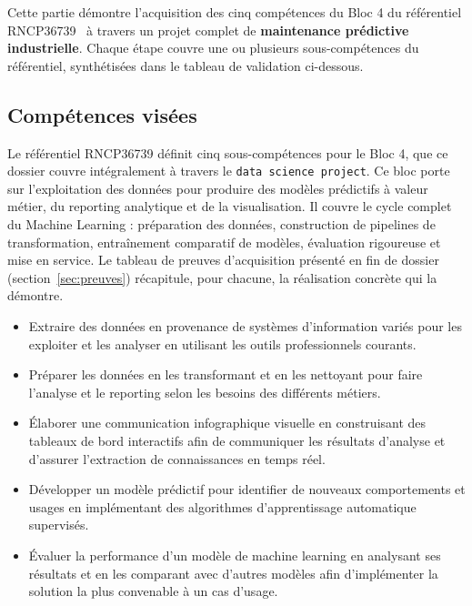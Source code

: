 \documentclass{article}
\begin{document}
Cette partie démontre l'acquisition des cinq compétences du Bloc 4 du référentiel
RNCP36739~\cite{rncp} à travers un projet complet de \textbf{maintenance prédictive
    industrielle}. Chaque étape couvre une ou plusieurs sous-compétences du référentiel,
synthétisées dans le tableau de validation ci-dessous.

\subsection{Compétences visées}

Le référentiel RNCP36739 définit cinq sous-compétences pour le Bloc 4, que ce
dossier couvre intégralement à travers le \texttt{data science project}.
Ce bloc porte sur l'exploitation des données pour produire des modèles prédictifs
à valeur métier, du reporting analytique et de la visualisation. Il couvre le cycle
complet du Machine Learning : préparation des données, construction de pipelines de
transformation, entraînement comparatif de modèles, évaluation rigoureuse et mise
en service. Le tableau de preuves d'acquisition présenté en fin de dossier
(section~\ref{sec:preuves}) récapitule, pour chacune, la réalisation concrète qui
la démontre.

\begin{itemize}[leftmargin=1.4em, itemsep=3pt, topsep=3pt]
    \item Extraire des données en provenance de systèmes d'information variés pour
          les exploiter et les analyser en utilisant les outils professionnels courants.
    \item Préparer les données en les transformant et en les nettoyant pour faire
          l'analyse et le reporting selon les besoins des différents métiers.
    \item Élaborer une communication infographique visuelle en construisant des
          tableaux de bord interactifs afin de communiquer les résultats d'analyse et
          d'assurer l'extraction de connaissances en temps réel.
    \item Développer un modèle prédictif pour identifier de nouveaux comportements
          et usages en implémentant des algorithmes d'apprentissage automatique supervisés.
    \item Évaluer la performance d'un modèle de machine learning en analysant ses
          résultats et en les comparant avec d'autres modèles afin d'implémenter la
          solution la plus convenable à un cas d'usage.
\end{itemize}
\end{document}
